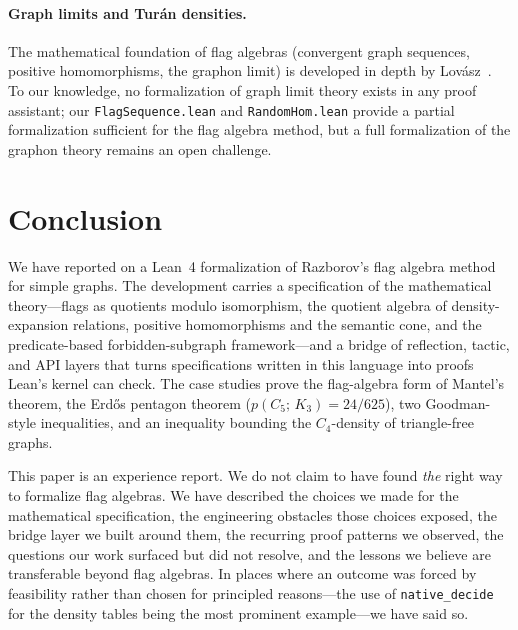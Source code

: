 \documentclass{article}
\newcommand{\tdensity}[2]{p(#1;\,#2)}
\newcommand{\lean}[1]{\texttt{#1}}
\begin{document}
\paragraph{Graph limits and Turán densities.}
The mathematical foundation of flag algebras (convergent graph sequences,
positive homomorphisms, the graphon limit) is developed in depth by
Lov\'asz~\cite{lovasz2012large}.  To our knowledge, no formalization of
graph limit theory exists in any proof assistant; our \lean{FlagSequence.lean}
and \lean{RandomHom.lean} provide a partial formalization sufficient for
the flag algebra method, but a full formalization of the graphon theory
remains an open challenge.


\section{Conclusion}
\label{sec:conclusion}

We have reported on a Lean~4 formalization of Razborov's flag algebra method
for simple graphs.  The development carries a specification of the
mathematical theory---flags as quotients modulo isomorphism, the quotient
algebra of density-expansion relations, positive homomorphisms and the
semantic cone, and the predicate-based forbidden-subgraph framework---and a
bridge of reflection, tactic, and API layers that turns specifications
written in this language into proofs Lean's kernel can check.  The case
studies prove the flag-algebra form of Mantel's theorem, the Erd\H{o}s
pentagon theorem ($\tdensity{C_5}{K_3} = 24/625$), two Goodman-style
inequalities, and an inequality bounding the $C_4$-density of triangle-free
graphs.

This paper is an experience report.  We do not claim to have found
\emph{the} right way to formalize flag algebras.  We have described the
choices we made for the mathematical specification, the engineering
obstacles those choices exposed, the bridge layer we built around them, the
recurring proof patterns we observed, the questions our work surfaced but
did not resolve, and the lessons we believe are transferable beyond flag
algebras.  In places where an outcome was forced by feasibility rather than
chosen for principled reasons---the use of \lean{native\_decide} for the
density tables being the most prominent example---we have said so.
\end{document}
